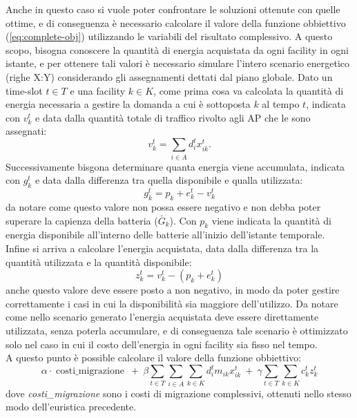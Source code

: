 Anche in questo caso si vuole poter confrontare le soluzioni ottenute con quelle ottime, e di conseguenza è necessario calcolare il valore della funzione obbiettivo (\autoref{eq:complete-obj}) utilizzando le variabili del risultato complessivo. A questo scopo, bisogna conoscere la quantità di energia acquistata da ogni facility in ogni istante, e per ottenere tali valori è necessario simulare l'intero scenario energetico (righe X:Y) considerando gli assegnamenti dettati dal piano globale. Dato un time-slot $t \in T$ e una facility $k \in K$, come prima cosa va calcolata la quantità di energia necessaria a gestire la domanda a cui è sottoposta $k$ al tempo $t$, indicata con $v^t_k$ e data dalla quantità totale di traffico rivolto agli AP che le sono assegnati:
\begin{equation}
    v^t_k = \sum_{i \in A} d^t_i x^t_{ik}.
\end{equation}
Successivamente bisgona determinare quanta energia viene accumulata, indicata con $g^t_k$ e data dalla differenza tra quella disponibile e qualla utilizzata:
\begin{equation}
    g^t_k = p_k + e^t_k- v^t_k
\end{equation}
da notare come questo valore non possa essere negativo e non debba poter superare la capienza della batteria ($\bar{G}_k$). Con $p_k$ viene indicata la quantità di energia disponibile all'interno delle batterie all'inizio dell'istante temporale.\\
Infine si arriva a calcolare l'energia acquistata, data dalla differenza tra la quantità utilizzata e la quantità disponibile:
\begin{equation}
    z^t_k = v^t_k - \left(p_k + e^t_k\right)
\end{equation}
anche questo valore deve essere posto a non negativo, in modo da poter gestire correttamente i casi in cui la disponibilità sia maggiore dell'utilizzo. Da notare come nello scenario generato l'energia acquistata deve essere direttamente utilizzata, senza poterla accumulare, e di conseguenza tale scenario è ottimizzato solo nel caso in cui il costo dell'energia in ogni facility sia fisso nel tempo.\\
A questo punto è possible calcolare il valore della funzione obbiettivo:
\begin{equation}
    \alpha \cdot \operatorname{costi\_migrazione} ~ + ~ \beta \sum_{t \in T}\sum_{i \in A}\sum_{k \in K} d^t_i m_{ik} x^t_{ik} ~ + ~ \gamma \sum_{t \in T} \sum_{k \in K} c^t_k z^t_k
\end{equation}
dove \textit{costi\_migrazione} sono i costi di migrazione complessivi, ottenuti nello stesso modo dell'euristica precedente.\\
